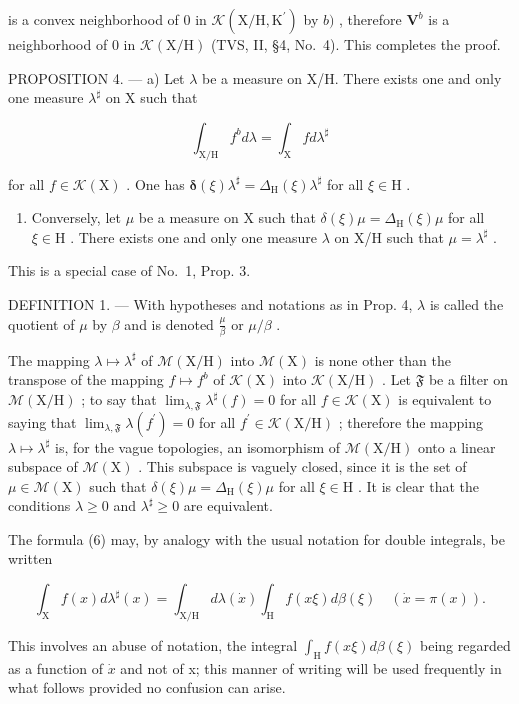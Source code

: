 is a convex neighborhood of 0 in \(\mathcal{K}(\mathrm{X / H},\mathrm{K}^{\prime})\) by \(b)\) , therefore \(\mathbf{V}^b\) is a neighborhood of 0 in \(\mathcal{K}(\mathrm{X / H})\) (TVS, II, §4, No.~4). This completes the proof.

PROPOSITION 4. --- a) Let \(\lambda\) be a measure on X/H. There exists one and only one measure \(\lambda^{\sharp}\) on X such that

\[
\int_ {\mathrm{X} / \mathrm{H}} f ^ {b} d \lambda = \int_ {\mathrm{X}} f d \lambda^ {\sharp}\tag{6}
\]

for all \(f \in \mathcal{K}(\mathrm{X})\) . One has \(\pmb{\delta}(\xi)\lambda^{\sharp} = \Delta_{\mathrm{H}}(\xi)\lambda^{\sharp}\) for all \(\xi \in \mathrm{H}\) .

\begin{enumerate}
\def\labelenumi{\alph{enumi})}
\setcounter{enumi}{1}
\tightlist
\item
  Conversely, let \(\mu\) be a measure on X such that \(\delta(\xi)\mu = \Delta_{\mathrm{H}}(\xi)\mu\) for all \(\xi \in \mathrm{H}\) . There exists one and only one measure \(\lambda\) on X/H such that \(\mu = \lambda^{\sharp}\) .
\end{enumerate}

This is a special case of No.~1, Prop. 3.

DEFINITION 1. --- With hypotheses and notations as in Prop. 4, \(\lambda\) is called the quotient of \(\mu\) by \(\beta\) and is denoted \(\frac{\mu}{\beta}\) or \(\mu/\beta\) .

The mapping \(\lambda \mapsto \lambda^{\sharp}\) of \(\mathcal{M}(\mathrm{X / H})\) into \(\mathcal{M}(\mathrm{X})\) is none other than the transpose of the mapping \(f\mapsto f^{b}\) of \(\mathcal{K}(\mathrm{X})\) into \(\mathcal{K}(\mathrm{X / H})\) . Let \(\mathfrak{F}\) be a filter on \(\mathcal{M}(\mathrm{X / H})\) ; to say that \(\lim_{\lambda ,\mathfrak{F}}\lambda^{\sharp}(f) = 0\) for all \(f\in \mathcal{K}(\mathrm{X})\) is equivalent to saying that \(\lim_{\lambda ,\mathfrak{F}}\lambda (f^{\prime}) = 0\) for all \(f^{\prime}\in \mathcal{K}(\mathrm{X / H})\) ; therefore the mapping \(\lambda \mapsto \lambda^{\sharp}\) is, for the vague topologies, an isomorphism of \(\mathcal{M}(\mathrm{X / H})\) onto a linear subspace of \(\mathcal{M}(\mathrm{X})\) . This subspace is vaguely closed, since it is the set of \(\mu \in \mathcal{M}(\mathrm{X})\) such that \(\delta (\xi)\mu = \Delta_{\mathrm{H}}(\xi)\mu\) for all \(\xi \in \mathrm{H}\) . It is clear that the conditions \(\lambda \geqslant 0\) and \(\lambda^{\sharp}\geqslant 0\) are equivalent.

The formula (6) may, by analogy with the usual notation for double integrals, be written

\[
\int_ {\mathrm{X}} f (x) d \lambda^ {\sharp} (x) = \int_ {\mathrm{X/H}} d \lambda (\dot {x}) \int_ {\mathrm{H}} f (x \xi) d \beta (\xi) \quad (\dot {x} = \pi (x)).\tag{7}
\]

This involves an abuse of notation, the integral \(\int_{\mathrm{H}} f(x\xi) d\beta(\xi)\) being regarded as a function of \(\dot{x}\) and not of x; this manner of writing will be used frequently in what follows provided no confusion can arise.
